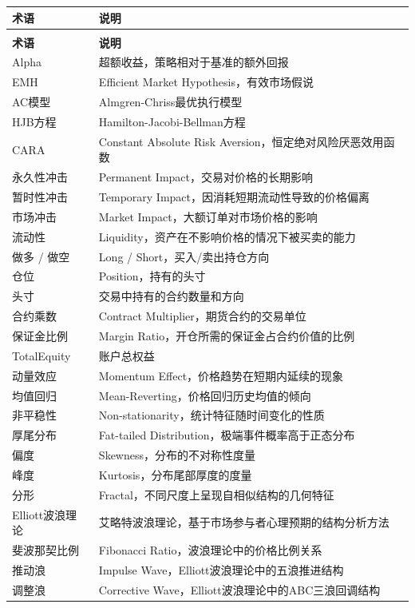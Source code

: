 \begin{longtable}{>{\raggedright\arraybackslash}p{4.5cm} p{9.5cm}}
\toprule
\textbf{术语} & \textbf{说明} \\
\midrule
\endfirsthead
\multicolumn{2}{c}{\tablename\ -- 续表} \\
\toprule
\textbf{术语} & \textbf{说明} \\
\midrule
\endhead
\bottomrule
\endlastfoot

Alpha & 超额收益，策略相对于基准的额外回报 \\
EMH & Efficient Market Hypothesis，有效市场假说 \\
AC模型 & Almgren-Chriss最优执行模型 \\
HJB方程 & Hamilton-Jacobi-Bellman方程 \\
CARA & Constant Absolute Risk Aversion，恒定绝对风险厌恶效用函数 \\
永久性冲击 & Permanent Impact，交易对价格的长期影响 \\
暂时性冲击 & Temporary Impact，因消耗短期流动性导致的价格偏离 \\
市场冲击 & Market Impact，大额订单对市场价格的影响 \\
流动性 & Liquidity，资产在不影响价格的情况下被买卖的能力 \\
做多 / 做空 & Long / Short，买入/卖出持仓方向 \\
仓位 & Position，持有的头寸 \\
头寸 & 交易中持有的合约数量和方向 \\
合约乘数 & Contract Multiplier，期货合约的交易单位 \\
保证金比例 & Margin Ratio，开仓所需的保证金占合约价值的比例 \\
TotalEquity & 账户总权益 \\
动量效应 & Momentum Effect，价格趋势在短期内延续的现象 \\
均值回归 & Mean-Reverting，价格回归历史均值的倾向 \\
非平稳性 & Non-stationarity，统计特征随时间变化的性质 \\
厚尾分布 & Fat-tailed Distribution，极端事件概率高于正态分布 \\
偏度 & Skewness，分布的不对称性度量 \\
峰度 & Kurtosis，分布尾部厚度的度量 \\
分形 & Fractal，不同尺度上呈现自相似结构的几何特征 \\
Elliott波浪理论 & 艾略特波浪理论，基于市场参与者心理预期的结构分析方法 \\
斐波那契比例 & Fibonacci Ratio，波浪理论中的价格比例关系 \\
推动浪 & Impulse Wave，Elliott波浪理论中的五浪推进结构 \\
调整浪 & Corrective Wave，Elliott波浪理论中的ABC三浪回调结构 \\
\end{longtable}

